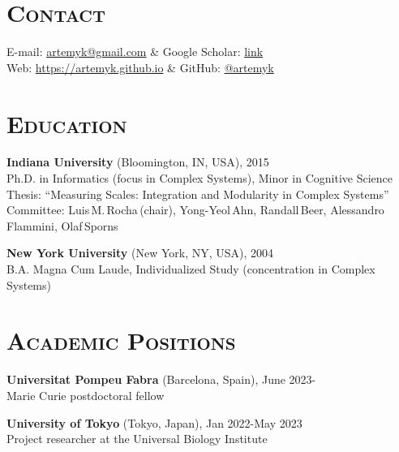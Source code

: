 \documentclass[margin,line,centered]{res}
\begin{document}
\address{Universal Biology Institute, University of Tokyo}

\begin{resume}

\section{\textsc{Contact}}

\begin{ncolumn}{2}
E-mail: \href{mailto:artemyk@gmail.com}{artemyk@gmail.com} & Google Scholar: \href{https://scholar.google.com/citations?user=RmRwJJIAAAAJ\&sortby=pubdate}{link}\\
\hspace{7pt}  Web: \href{https://artemyk.github.io}{https://artemyk.github.io} & \hspace{30pt} GitHub: \href{https://github.com/artemyk/}{@artemyk}
\end{ncolumn}

\section{\textsc{Education}}

\textbf{Indiana University} (Bloomington, IN, USA), 2015\\
Ph.D. in Informatics (focus in Complex Systems), Minor in Cognitive
Science\\
Thesis: ``Measuring Scales: Integration and Modularity in Complex
Systems''\\
Committee: Luis\,M.\,Rocha\,(chair), Yong-Yeol\,Ahn, Randall\,Beer, Alessandro\,Flammini, Olaf\,Sporns

\textbf{New York University} (New York, NY, USA), 2004 \\
B.A. Magna Cum Laude, Individualized Study (concentration in Complex
Systems)


\section{\textsc{Academic Positions}}

\textbf{Universitat Pompeu Fabra} (Barcelona, Spain), June 2023- \\
Marie Curie postdoctoral fellow


\textbf{University of Tokyo} (Tokyo, Japan), Jan 2022-May 2023 \\
Project researcher at the Universal Biology Institute


\end{resume}
\end{document}
